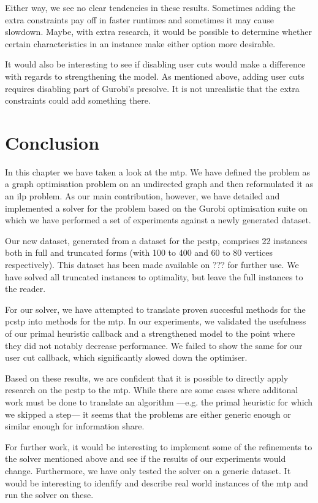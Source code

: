 Either way, we see no clear tendencies in these results. Sometimes adding the extra constraints
pay off in faster runtimes and sometimes it may cause slowdown. Maybe, with extra research, it
would be possible to determine whether certain characteristics in an instance make either option
more desirable.

It would also be interesting to see if disabling user cuts would make a difference with regards
to strengthening the model. As mentioned above, adding user cuts requires disabling part of
Gurobi's presolve. It is not unrealistic that the extra constraints could add something there.
\section{Conclusion}
In this chapter we have taken a look at the \acrlong{mtp}. We have defined the problem as
a graph optimisation problem on an undirected graph and then reformulated it as an \gls{ilp}
problem. As our main contribution, however, we have detailed and implemented a solver for the
problem based on the Gurobi optimisation suite on which we have performed a set of experiments
against a newly generated dataset.

Our new dataset, generated from a dataset for the \gls{pcstp}, comprises 22 instances both in
full and truncated forms (with 100 to 400 and 60 to 80 vertices respectively). This dataset
has been made available on ??? for further use. We have solved all truncated instances to
optimality, but leave the full instances to the reader.

For our solver, we have attempted to translate proven succesful methods for the \gls{pcstp}
into methods for
the \gls{mtp}.
In our experiments, we validated the usefulness of our primal heuristic callback and
a strengthened model to the point where they did not notably decrease performance.
We failed to show the same for our user cut callback, which significantly slowed down the
optimiser.

Based on these results, we are confident that it is possible to directly apply research on
the \gls{pcstp} to the \gls{mtp}. While there are some cases where additonal work must be
done to translate an algorithm ---e.g. the primal heuristic for which we skipped a step---
it seems that the problems are either generic enough or similar enough for information share.

For further work, it would be interesting to implement some of the refinements to the solver
mentioned above and see if the results of our experiments would change. Furthermore, we have
only tested the solver on a generic dataset. It would be interesting to idenfify and describe
real world instances of the \gls{mtp} and run the solver on these.


